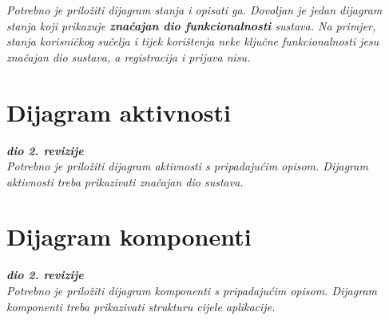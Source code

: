 			\textit{Potrebno je priložiti dijagram stanja i opisati ga. Dovoljan je jedan dijagram stanja koji prikazuje \textbf{značajan dio funkcionalnosti} sustava. Na primjer, stanja korisničkog sučelja i tijek korištenja neke ključne funkcionalnosti jesu značajan dio sustava, a registracija i prijava nisu. }
			
			
			\eject 
		
		\section{Dijagram aktivnosti}
			
			\textbf{\textit{dio 2. revizije}}\\
			
			 \textit{Potrebno je priložiti dijagram aktivnosti s pripadajućim opisom. Dijagram aktivnosti treba prikazivati značajan dio sustava.}
			
			\eject
		\section{Dijagram komponenti}
		
			\textbf{\textit{dio 2. revizije}}\\
		
			 \textit{Potrebno je priložiti dijagram komponenti s pripadajućim opisom. Dijagram komponenti treba prikazivati strukturu cijele aplikacije.}